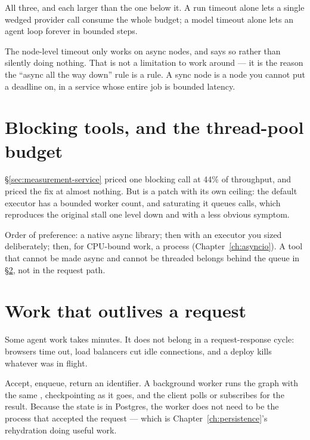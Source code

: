 All three, and each larger than the one below it. A run timeout alone lets a
single wedged provider call consume the whole budget; a model timeout alone lets
an agent loop forever in bounded steps.

\begin{warning}
The node-level timeout only works on async nodes, and says so rather than
silently doing nothing. That is not a limitation to work around --- it is the
reason the ``async all the way down'' rule is a rule. A sync node is a node you
cannot put a deadline on, in a service whose entire job is bounded latency.
\end{warning}

\section{Blocking tools, and the thread-pool budget}
\label{sec:blocking-tools}

\S\ref{sec:measurement-service} priced one blocking call at 44\% of throughput,
and priced the fix at almost nothing. But  is a patch with its
own ceiling: the default executor has a bounded worker count, and saturating it
queues calls, which reproduces the original stall one level down and with a less
obvious symptom.

Order of preference: a native async library; then  with an
executor you sized deliberately; then, for CPU-bound work, a process
(Chapter~\ref{ch:asyncio}). A tool that cannot be made async and cannot be
threaded belongs behind the queue in \S\ref{sec:long-running}, not in the request
path.

\section{Work that outlives a request}
\label{sec:long-running}

Some agent work takes minutes. It does not belong in a request-response cycle:
browsers time out, load balancers cut idle connections, and a deploy kills
whatever was in flight.

Accept, enqueue, return an identifier. A background worker runs the graph with
the same , checkpointing as it goes, and the client polls or
subscribes for the result. Because the state is in Postgres, the worker does not
need to be the process that accepted the request --- which is
Chapter~\ref{ch:persistence}'s rehydration doing useful work.

